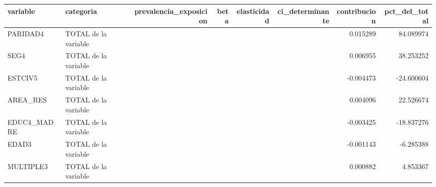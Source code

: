 \begin{tabular}{llrrrrrr}
\toprule
variable & categoria & prevalencia\_exposicion & beta & elasticidad & ci\_determinante & contribucion & pct\_del\_total \\
\midrule
PARIDAD4 & TOTAL de la variable &  &  &  &  & 0.015289 & 84.089974 \\
SEG4 & TOTAL de la variable &  &  &  &  & 0.006955 & 38.253252 \\
ESTCIV5 & TOTAL de la variable &  &  &  &  & -0.004473 & -24.600604 \\
AREA\_RES & TOTAL de la variable &  &  &  &  & 0.004096 & 22.526674 \\
EDUC4\_MADRE & TOTAL de la variable &  &  &  &  & -0.003425 & -18.837276 \\
EDAD3 & TOTAL de la variable &  &  &  &  & -0.001143 & -6.285388 \\
MULTIPLE3 & TOTAL de la variable &  &  &  &  & 0.000882 & 4.853367 \\
\bottomrule
\end{tabular}
